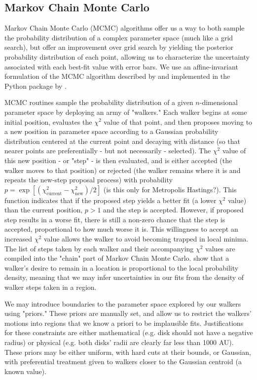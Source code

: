 \subsection{Markov Chain Monte Carlo}
\label{subsection:mcmc}

Markov Chain Monte Carlo (MCMC) algorithms offer us a way to both sample the probability distribution of a complex parameter space (much like a grid search), but offer an improvement over grid search by yielding the posterior probability distribution of each point, allowing us to characterize the uncertainty associated with each best-fit value with error bars. We use an affine-invariant formulation of the MCMC algorithm described by \cite{Goodman2010} and implemented in the Python package  by \cite{ForemanMackey2013}.

MCMC routines sample the probability distribution of a given $n$-dimensional parameter space by deploying an army of "walkers." Each walker begins at some initial position, evaluates the $\chi^2$ value of that point, and then proposes moving to a new position in parameter space according to a Gaussian probability distribution centered at the current point and decaying with distance (so that nearer points are preferentially - but not necessarily - selected). The $\chi^2$ value of this new position - or "step" - is then evaluated, and is either accepted (the walker moves to that position) or rejected (the walker remains where it is and repeats the new-step proposal process) with probability $p = \exp \left[ (\chi_\text{current}^2 - \chi_\text{new}^2)/2 \right]$ (is this only for Metropolis Hastings?). This function indicates that if the proposed step yields a better fit (a lower $\chi^2$ value) than the current position, $p > 1$ and the step is accepted. However, if proposed step results in a worse fit, there is still a non-zero chance that the step is accepted, proportional to how much worse it is. This willingness to accept an increased $\chi^2$ value allows the walker to avoid becoming trapped in local minima. The list of steps taken by each walker and their accompanying $\chi^2$ values are compiled into the "chain" part of Markov Chain Monte Carlo. \cite{Goodman2010} show that a walker's desire to remain in a location is proportional to the local probability density, meaning that we may infer uncertainties in our fits from the density of walker steps taken in a region.

We may introduce boundaries to the parameter space explored by our walkers using "priors." These priors are manually set, and allow us to restrict the walkers' motions into regions that we know a priori to be implausible fits. Justifications for these constraints are either mathematical (e.g. disk should not have a negative radius) or physical (e.g. both disks' radii are clearly far less than 1000 AU). These priors may be either uniform, with hard cuts at their bounds, or Gaussian, with preferential treatment given to walkers closer to the Gaussian centroid (a known value).

